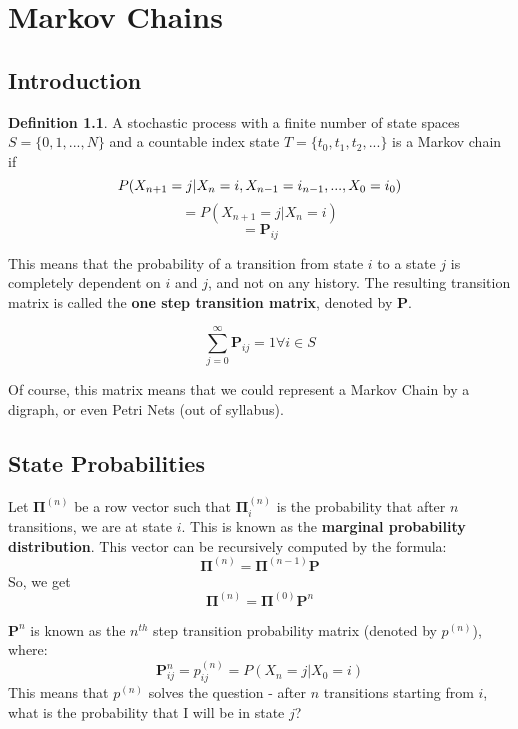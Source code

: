 \documentclass[12pt,letterpaper]{book}
\theoremstyle{definition}
\newtheorem{definition}{Definition}%
\begin{document}
\chapter{Markov Chains}

\section{Introduction}

\begin{definition}
  A stochastic process with a finite number of state spaces $S = \{0,1,...,N\}$ and a countable index state $T = \{t_0,t_1,t_2,...\}$ is a Markov chain if
  \[P(X_{n+1} = j|X_n = i, X_{n-1} = i_{n-1},...,X_0 = i_0) \\ \]
  \[= P(X_{n+1} = j | X_n = i) \]
  \[= \mathbf{P}_{ij}\]
\end{definition}

This means that the probability of a transition from state $i$ to a state $j$ is completely dependent on $i$ and $j$, and not on any history. The resulting transition matrix is called the \textbf{one step transition matrix}, denoted by $\textbf{P}$.

\begin{lemma}
  \[\sum_{j = 0}^{\infty} \mathbf{P}_{ij} = 1 \forall i \in S\]
\end{lemma}

Of course, this matrix means that we could represent a Markov Chain by a digraph, or even Petri Nets (out of syllabus). 

\section{State Probabilities}

Let $\mathbf{\Pi}^{(n)}$ be a row vector such that $\mathbf{\Pi}^{(n)}_i$ is the probability that after $n$ transitions, we are at state $i$. This is known as the \textbf{marginal probability distribution}. This vector can be recursively computed by the formula:
\[ \mathbf{\Pi}^{(n)} = \mathbf{\Pi}^{(n-1)} \mathbf{P} \]
So, we get
\[ \mathbf{\Pi}^{(n)} = \mathbf{\Pi}^{(0)} \mathbf{P}^n \]

$\mathbf{P}^n$ is known as the $n^{th}$ step transition probability matrix (denoted by $p^{(n)}$), where:
\[\mathbf{P}^{n}_{ij} = p_{ij}^{(n)} = P(X_n = j|X_0 = i)\]
This means that $p^{(n)}$ solves the question - after $n$ transitions starting from $i$, what is the probability that I will be in state $j$?
\end{document}
